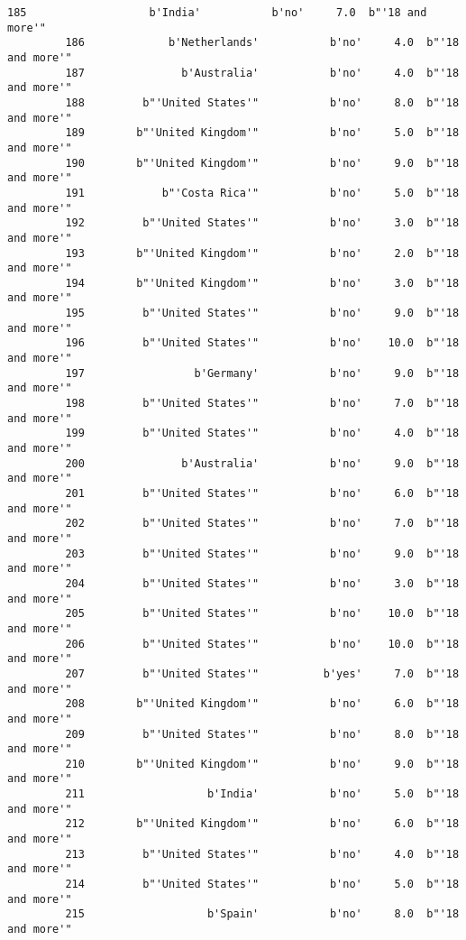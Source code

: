 \documentclass[11pt]{article}
\begin{document}
\begin{Verbatim}[commandchars=\\\{\}]
         185                   b'India'           b'no'     7.0  b"'18 and more'"   
         186             b'Netherlands'           b'no'     4.0  b"'18 and more'"   
         187               b'Australia'           b'no'     4.0  b"'18 and more'"   
         188         b"'United States'"           b'no'     8.0  b"'18 and more'"   
         189        b"'United Kingdom'"           b'no'     5.0  b"'18 and more'"   
         190        b"'United Kingdom'"           b'no'     9.0  b"'18 and more'"   
         191            b"'Costa Rica'"           b'no'     5.0  b"'18 and more'"   
         192         b"'United States'"           b'no'     3.0  b"'18 and more'"   
         193        b"'United Kingdom'"           b'no'     2.0  b"'18 and more'"   
         194        b"'United Kingdom'"           b'no'     3.0  b"'18 and more'"   
         195         b"'United States'"           b'no'     9.0  b"'18 and more'"   
         196         b"'United States'"           b'no'    10.0  b"'18 and more'"   
         197                 b'Germany'           b'no'     9.0  b"'18 and more'"   
         198         b"'United States'"           b'no'     7.0  b"'18 and more'"   
         199         b"'United States'"           b'no'     4.0  b"'18 and more'"   
         200               b'Australia'           b'no'     9.0  b"'18 and more'"   
         201         b"'United States'"           b'no'     6.0  b"'18 and more'"   
         202         b"'United States'"           b'no'     7.0  b"'18 and more'"   
         203         b"'United States'"           b'no'     9.0  b"'18 and more'"   
         204         b"'United States'"           b'no'     3.0  b"'18 and more'"   
         205         b"'United States'"           b'no'    10.0  b"'18 and more'"   
         206         b"'United States'"           b'no'    10.0  b"'18 and more'"   
         207         b"'United States'"          b'yes'     7.0  b"'18 and more'"   
         208        b"'United Kingdom'"           b'no'     6.0  b"'18 and more'"   
         209         b"'United States'"           b'no'     8.0  b"'18 and more'"   
         210        b"'United Kingdom'"           b'no'     9.0  b"'18 and more'"   
         211                   b'India'           b'no'     5.0  b"'18 and more'"   
         212        b"'United Kingdom'"           b'no'     6.0  b"'18 and more'"   
         213         b"'United States'"           b'no'     4.0  b"'18 and more'"   
         214         b"'United States'"           b'no'     5.0  b"'18 and more'"   
         215                   b'Spain'           b'no'     8.0  b"'18 and more'"   

\end{Verbatim}
\end{document}
